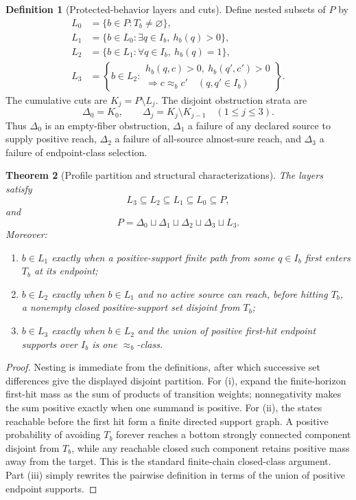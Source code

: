 \documentclass[11pt]{article}
\newtheorem{theorem}{Theorem}[section]
\theoremstyle{definition}
\newtheorem{definition}[theorem]{Definition}
\theoremstyle{remark}
\numberwithin{equation}{section}
\begin{document}
\begin{definition}[Protected-behavior layers and cuts]
Define nested subsets of $P$ by
\begin{align*}
 L_0&=\{b\in P:T_b\ne\varnothing\},\\
 L_1&=\{b\in L_0:\exists q\in I_b,\ h_b(q)>0\},\\
 L_2&=\{b\in L_1:\forall q\in I_b,\ h_b(q)=1\},\\
 L_3&=\left\{b\in L_2:
   \begin{array}{l}
   h_b(q,c)>0,\ h_b(q',c')>0\\[-2pt]
   \Longrightarrow c\approx_b c'
   \quad(q,q'\in I_b)
   \end{array}\right\}.
\end{align*}
The cumulative cuts are $K_j=P\setminus L_j$.  The disjoint obstruction
strata are
\[
 \Delta_0=K_0,\qquad
 \Delta_j=K_j\setminus K_{j-1}\quad(1\leq j\leq3).
\]
Thus $\Delta_0$ is an empty-fiber obstruction, $\Delta_1$ a failure of any
declared source to supply positive reach, $\Delta_2$ a failure of all-source
almost-sure reach, and $\Delta_3$ a failure of endpoint-class selection.
\end{definition}

\begin{theorem}[Profile partition and structural characterizations]
\label{thm:protected-profile}
The layers satisfy
\[
 L_3\subseteq L_2\subseteq L_1\subseteq L_0\subseteq P,
\]
and
\[
 P=\Delta_0\sqcup\Delta_1\sqcup\Delta_2\sqcup\Delta_3\sqcup L_3.
\]
Moreover:
\begin{enumerate}[label=(\roman*)]
\item $b\in L_1$ exactly when a positive-support finite path from some
      $q\in I_b$ first enters $T_b$ at its endpoint;
\item $b\in L_2$ exactly when $b\in L_1$ and no active source can reach,
      before hitting $T_b$, a nonempty closed positive-support set disjoint
      from $T_b$;
\item $b\in L_3$ exactly when $b\in L_2$ and the union of positive first-hit
      endpoint supports over $I_b$ is one $\approx_b$-class.
\end{enumerate}
\end{theorem}

\begin{proof}
Nesting is immediate from the definitions, after which successive set
differences give the displayed disjoint partition.  For (i), expand the
finite-horizon first-hit mass as the sum of products of transition weights;
nonnegativity makes the sum positive exactly when one summand is positive.
For (ii), the states reachable before the first hit form a finite directed
support graph.  A positive probability of avoiding $T_b$ forever reaches a
bottom strongly connected component disjoint from $T_b$, while any reachable
closed such component retains positive mass away from the target.  This is the
standard finite-chain closed-class argument.  Part (iii) simply rewrites the
pairwise definition in terms of the union of positive endpoint supports.
\end{proof}
\end{document}
